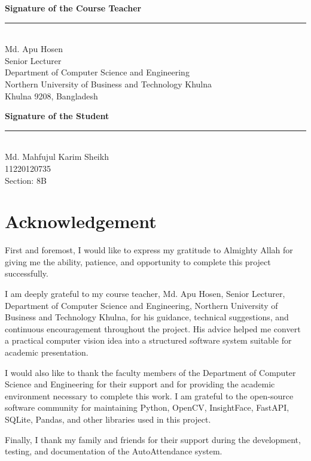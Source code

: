 \documentclass[12pt,a4paper]{report}
\newcommand{\JustifiedNormal}{\fontsize{12}{14}\selectfont\justifying\setlength{\parindent}{0pt}}
\begin{document}
\vspace{3em}
\noindent
\begin{minipage}[t]{0.47\textwidth}
\textbf{Signature of the Course Teacher}\\[2em]
\rule{6cm}{0.4pt}\\
Md. Apu Hosen\\
Senior Lecturer\\
Department of Computer Science and Engineering\\
Northern University of Business and Technology Khulna\\
Khulna 9208, Bangladesh
\end{minipage}
\hfill
\begin{minipage}[t]{0.45\textwidth}
\textbf{Signature of the Student}\\[2em]
\rule{6cm}{0.4pt}\\
Md. Mahfujul Karim Sheikh\\
11220120735\\
Section: 8B
\end{minipage}

\clearpage

\chapter*{Acknowledgement}
\vspace{2em}
\JustifiedNormal
First and foremost, I would like to express my gratitude to Almighty Allah for giving me the ability, patience, and opportunity to complete this project successfully.

I am deeply grateful to my course teacher, Md. Apu Hosen, Senior Lecturer, Department of Computer Science and Engineering, Northern University of Business and Technology Khulna, for his guidance, technical suggestions, and continuous encouragement throughout the project. His advice helped me convert a practical computer vision idea into a structured software system suitable for academic presentation.

I would also like to thank the faculty members of the Department of Computer Science and Engineering for their support and for providing the academic environment necessary to complete this work. I am grateful to the open-source software community for maintaining Python, OpenCV, InsightFace, FastAPI, SQLite, Pandas, and other libraries used in this project.

Finally, I thank my family and friends for their support during the development, testing, and documentation of the AutoAttendance system.
\end{document}
